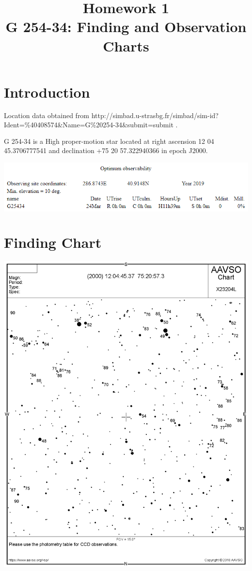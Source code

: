 \documentclass{aastex62}
\begin{document}
\title{Homework 1 \\ G 254-34: Finding and Observation Charts}
\section{Introduction}
Location data obtained from http://simbad.u-strasbg.fr/simbad/sim-id?Ident=\%40408574\&Name=G\%20254-34\&submit=submit .

G 254-34 is a High proper-motion star located at right ascension 12 04 45.3706777541 and declination +75 20 57.322940366 in epoch J2000. 

\begin{center}
\includegraphics[scale=0.6]{optimum.PNG}
\end{center}


\section{Finding Chart}
\begin{center}
\includegraphics[scale=0.34]{Chart.png}
\end{center}
\end{document}
